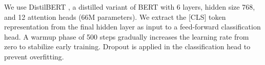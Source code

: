 We use DistilBERT \cite{Sanh2019DistilBERTAD}, a distilled variant of BERT with 6 layers, hidden size 768, and 12 attention heads (66M parameters). We extract the [CLS] token representation from the final hidden layer as input to a feed-forward classification head. A warmup phase of 500 steps gradually increases the learning rate from zero to stabilize early training. Dropout is applied in the classification head to prevent overfitting.

